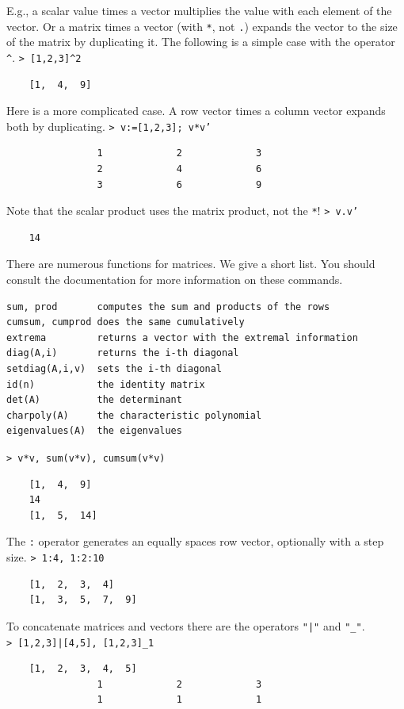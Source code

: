 \documentclass[11pt, a4paper]{article}
\newcommand{\emtcmd}[1]{\noindent\texttt{\textcolor{emtcommand}{>}\ #1}\par\smallskip}
\begin{document}
E.g., a scalar value times a vector multiplies the value with each element of the vector. Or a matrix times a vector (with \texttt{*}, not \texttt{.}) expands the vector to the size of the matrix by duplicating it. The following is a simple case with the operator \texttt{\^{}}.
\emtcmd{[1,2,3]\^{}2}
\begin{verbatim}
    [1,  4,  9]
\end{verbatim}

Here is a more complicated case. A row vector times a column vector expands both by duplicating.
\emtcmd{v:=[1,2,3]; v*v'}
\begin{verbatim}
                1             2             3
                2             4             6
                3             6             9
\end{verbatim}

Note that the scalar product uses the matrix product, not the \texttt{*}!
\emtcmd{v.v'}
\begin{verbatim}
    14
\end{verbatim}

There are numerous functions for matrices. We give a short list. You should consult the documentation for more information on these commands.
\begin{verbatim}
sum, prod       computes the sum and products of the rows
cumsum, cumprod does the same cumulatively
extrema         returns a vector with the extremal information
diag(A,i)       returns the i-th diagonal
setdiag(A,i,v)  sets the i-th diagonal
id(n)           the identity matrix
det(A)          the determinant
charpoly(A)     the characteristic polynomial
eigenvalues(A)  the eigenvalues
\end{verbatim}
\emtcmd{v*v, sum(v*v), cumsum(v*v)}
\begin{verbatim}
    [1,  4,  9]
    14
    [1,  5,  14]
\end{verbatim}

The \texttt{:} operator generates an equally spaces row vector, optionally with a step size.
\emtcmd{1:4, 1:2:10}
\begin{verbatim}
    [1,  2,  3,  4]
    [1,  3,  5,  7,  9]
\end{verbatim}

To concatenate matrices and vectors there are the operators \texttt{"|"} and \texttt{"\_"}.
\emtcmd{[1,2,3]|[4,5], [1,2,3]\_1}
\begin{verbatim}
    [1,  2,  3,  4,  5]
                1             2             3
                1             1             1
\end{verbatim}
\end{document}
